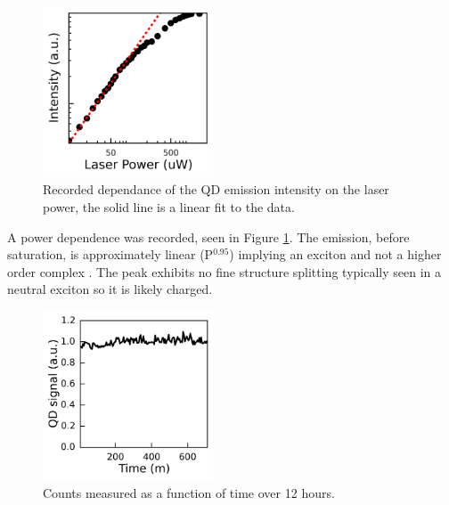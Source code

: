 \begin{figure}[h!] \begin{center}
\includegraphics[width=0.45\textwidth]{images/pdep.png} \caption{Recorded
dependance of the QD emission intensity on the laser power, the solid line is a
linear fit to the data.} \label{fig:pdep} \end{center} \end{figure}

A power dependence was recorded, seen in Figure \ref{fig:pdep}. The emission,
before saturation, is approximately linear (P$^{0.95}$) implying an exciton and
not a higher order complex \cite{grundmann1997theory}. The peak exhibits no fine
structure splitting typically seen in a neutral exciton
\cite{bayer2002fine,gammon1996fine} so it is likely charged.

\begin{figure}[h!] \begin{center}
\includegraphics[width=0.45\textwidth]{images/stability.png} \caption{Counts
measured as a function of time over 12 hours.} \label{fig:stab} \end{center}
\end{figure}

